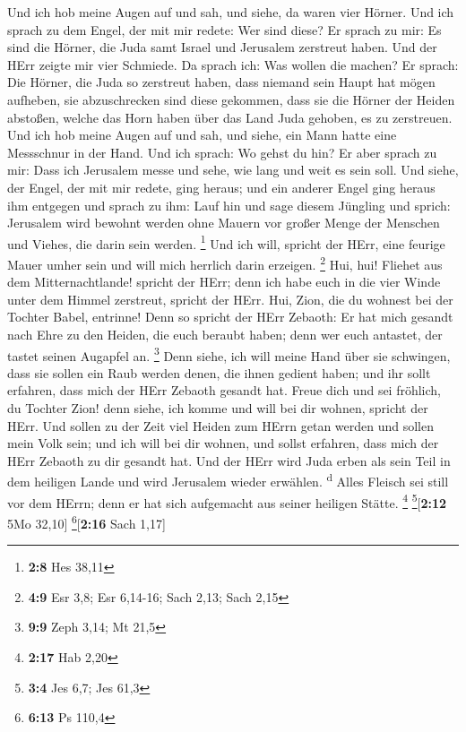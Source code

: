  Und ich hob meine Augen auf und sah, und siehe, da waren
vier Hörner.  Und ich sprach zu dem Engel, der mit mir
redete: Wer sind diese? Er sprach zu mir: Es sind die Hörner, die Juda
samt Israel und Jerusalem zerstreut haben.  Und der HErr
zeigte mir vier Schmiede.  Da sprach ich: Was wollen die
machen? Er sprach: Die Hörner, die Juda so zerstreut haben, dass niemand
sein Haupt hat mögen aufheben, sie abzuschrecken sind diese gekommen,
dass sie die Hörner der Heiden abstoßen, welche das Horn haben über das
Land Juda gehoben, es zu zerstreuen.  Und ich hob meine
Augen auf und sah, und siehe, ein Mann hatte eine Messschnur in der
Hand.  Und ich sprach: Wo gehst du hin? Er aber sprach zu
mir: Dass ich Jerusalem messe und sehe, wie lang und weit es sein soll.
 Und siehe, der Engel, der mit mir redete, ging heraus;
und ein anderer Engel ging heraus ihm entgegen  und sprach
zu ihm: Lauf hin und sage diesem Jüngling und sprich: Jerusalem wird
bewohnt werden ohne Mauern vor großer Menge der Menschen und Viehes, die
darin sein werden. \footnote{\textbf{2:8} Hes 38,11}  Und
ich will, spricht der HErr, eine feurige Mauer umher sein und will mich
herrlich darin erzeigen. \footnote{\textbf{4:9} Esr 3,8; Esr 6,14-16;
  Sach 2,13; Sach 2,15}  Hui, hui! Fliehet aus dem
Mitternachtlande! spricht der HErr; denn ich habe euch in die vier Winde
unter dem Himmel zerstreut, spricht der HErr.  Hui, Zion,
die du wohnest bei der Tochter Babel, entrinne!  Denn so
spricht der HErr Zebaoth: Er hat mich gesandt nach Ehre zu den Heiden,
die euch beraubt haben; denn wer euch antastet, der tastet seinen
Augapfel an. \footnote{\textbf{9:9} Zeph 3,14; Mt 21,5} 
Denn siehe, ich will meine Hand über sie schwingen, dass sie sollen ein
Raub werden denen, die ihnen gedient haben; und ihr sollt erfahren, dass
mich der HErr Zebaoth gesandt hat.  Freue dich und sei
fröhlich, du Tochter Zion! denn siehe, ich komme und will bei dir
wohnen, spricht der HErr.  Und sollen zu der Zeit viel
Heiden zum HErrn getan werden und sollen mein Volk sein; und ich will
bei dir wohnen, und sollst erfahren, dass mich der HErr Zebaoth zu dir
gesandt hat.  Und der HErr wird Juda erben als sein Teil
in dem heiligen Lande und wird Jerusalem wieder erwählen.
\textsuperscript{d}  Alles Fleisch sei still vor dem
HErrn; denn er hat sich aufgemacht aus seiner heiligen Stätte.
\footnote{\textbf{2:17} Hab 2,20} \footnote{\textbf{3:4} Jes 6,7; Jes
  61,3}{[}\textbf{2:12} 5Mo 32,10{]} \footnote{\textbf{6:13} Ps 110,4}{[}\textbf{2:16}
Sach 1,17{]}

